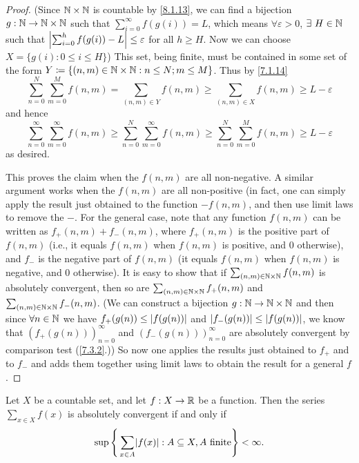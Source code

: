 \begin{proof}
  (Since \(\mathbb{N} \times \mathbb{N}\) is countable by \cref{8.1.13}, we can find a bijection \(g : \mathbb{N} \to \mathbb{N} \times \mathbb{N}\) such that \(\sum_{i = 0}^\infty f(g(i)) = L\), which means \(\forall \varepsilon > 0\), \(\exists\ H \in \mathbb{N}\) such that \(\left\lvert\sum_{i = 0}^h f(g(i)) - L\right\rvert \leq \varepsilon\) for all \(h \geq H\).
  Now we can choose \(X = \{g(i) : 0 \leq i \leq H\}\))
  This set, being finite, must be contained in some set of the form \(Y \coloneqq \{(n,m) \in \mathbb{N} \times \mathbb{N} : n \leq N; m \leq M \}\).
  Thus by \cref{7.1.14}
  \[
    \sum_{n = 0}^N \sum_{m = 0}^M f(n, m) = \sum_{(n, m) \in Y} f(n, m) \geq \sum_{(n, m) \in X} f(n, m) \geq L - \varepsilon
  \]
  and hence
  \[
    \sum_{n = 0}^\infty \sum_{m = 0}^\infty f(n, m) \geq \sum_{n = 0}^N \sum_{m = 0}^\infty f(n, m) \geq \sum_{n = 0}^N \sum_{m = 0}^M f(n, m) \geq L - \varepsilon
  \]
  as desired.

  This proves the claim when the \(f(n, m)\) are all non-negative.
  A similar argument works when the \(f(n, m)\) are all non-positive
  (in fact, one can simply apply the result just obtained to the function \(-f(n, m)\), and then use limit laws to remove the \(-\).
  For the general case, note that any function \(f(n, m)\) can be written as \(f_+(n, m) + f_-(n, m)\), where \(f_+(n, m)\) is the positive part of \(f(n, m)\)
  (i.e., it equals \(f(n, m)\) when \(f(n, m)\) is positive, and \(0\) otherwise),
  and \(f_-\) is the negative part of \(f(n, m)\)
  (it equals \(f(n, m)\) when \(f(n, m)\) is negative, and \(0\) otherwise).
  It is easy to show that if \(\sum_{(n, m) \in \mathbb{N} \times \mathbb{N}} f(n, m)\) is absolutely convergent, then so are \(\sum_{(n, m) \in \mathbb{N} \times \mathbb{N}} f_+(n, m)\) and \(\sum_{(n, m) \in \mathbb{N} \times \mathbb{N}} f_-(n, m)\).
  (We can construct a bijection \(g : \mathbb{N} \to \mathbb{N} \times \mathbb{N}\) and then since \(\forall n \in \mathbb{N}\) we have \(f_+(g(n)) \leq \left\lvert f(g(n))\right\rvert\) and \(\left\lvert f_-(g(n))\right\rvert \leq \left\lvert f(g(n))\right\rvert\), we know that \((f_+(g(n)))_{n = 0}^\infty\) and \((f_-(g(n)))_{n = 0}^\infty\) are absolutely convergent by comparison test (\cref{7.3.2}.))
  So now one applies the results just obtained to \(f_+\) and to \(f_-\) and adds them together using limit laws to obtain the result for a general \(f\).
\end{proof}

\begin{lem}\label{8.2.3}
  Let \(X\) be a countable set, and let \(f : X \to \mathbb{R}\) be a function.
  Then the series \(\sum_{x \in X} f(x)\) is absolutely convergent if and only if
  \[
    \sup\Bigg\{\sum_{x \in A} \abs{f(x)} : A \subseteq X, A \text{ finite}\Bigg\} < \infty.
  \]
\end{lem}

